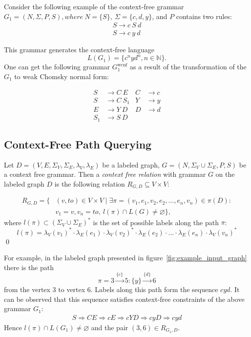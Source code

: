 Consider the following example of the context-free grammar $G_1=(N, \Sigma, P, S), where ~N=\{S\},~\Sigma=\{c, d, y\}$, and $P$ contains two rules: 
\begin{align}
\label{eqn:g1_example}
S \rightarrow c \ S \ d \nonumber\\
S \rightarrow c \ y \ d
\end{align}

This grammar generates the context-free language $$L(G_1) = \{c^nyd^n, n \in \mathbb{N}\}.$$
One can get the following grammar $G_1^{\text{wcnf}}$ as a result of the transformation of the $G_1$ to weak Chomsky normal form:

\begin{align*}
S& \to C \ E   & C& \to c   \\
S& \to C \ S_1 & Y& \to y   \\
E& \to Y \ D   & D& \to d   \\ 
S_1& \to S \ D &&
\end{align*}


\subsection{Context-Free Path Querying}

\begin{definition}
Let $D = (V, E, \Sigma_V, \Sigma_E, \lambda_V, \lambda_E)$ be a labeled graph, $G = (N, \Sigma_V \cup \Sigma_E, P, S)$ be a context free grammar. Then a \emph{context free relation} with grammar $G$ on the labeled graph $D$ is the following relation $R_{G, D} \subseteq V \times V$:

\begin{equation*} \label{eq1}
\begin{split}
R_{G, D} = \{&(v, to) \in V \times V \mid \exists \pi = (v_1, e_1, v_2, e_2, \ldots, e_n, v_n) \in \pi(D): \\
      &v_1 = v, v_n = to,~l(\pi) \cap L(G) \neq \varnothing \},
\end{split}
\end{equation*}
where $l(\pi) \subset (\Sigma_V \cup \Sigma_E)^*$ is the set of possible labels along the path $\pi$:
$$l(\pi) = \lambda_V(v_1)^* \cdot \lambda_E(e_1) \cdot \lambda_V(v_2)^* \cdot \lambda_E(e_2) \cdot \ldots \cdot \lambda_E(e_n) \cdot \lambda_V(v_n)^*$$
\qed
\end{definition}


For example, in the labeled graph presented in figure~\ref{fig:example_input_graph} there is the path $$\pi=3 \xrightarrow{\{c\}} 5:\{y\} \xrightarrow{\{d\}} 6$$ from the vertex 3 to vertex 6.
Labels along this path form the sequence $cyd$.
It can be observed that this sequence satisfies context-free constraints of the above grammar $G_1$:
    \begin{align*}
         S \Rightarrow CE \Rightarrow cE \Rightarrow cYD \Rightarrow cyD \Rightarrow cyd
    \end{align*}
Hence $l(\pi) \cap L(G_1) \neq \varnothing$ and the pair $(3,6) \in R_{G_1, D}$.

